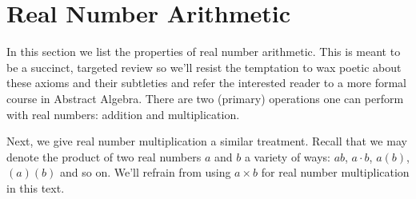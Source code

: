 \section{Real Number Arithmetic}
\label{RealNumberArithmetic}


In this section we list the properties of real number arithmetic.  This is meant to be a succinct, targeted review so we'll resist the temptation to wax poetic about these axioms and their subtleties and refer the interested reader to a more formal course in Abstract Algebra.  There are two (primary) operations one can perform with real numbers:  addition and multiplication.  

\medskip


\medskip

Next, we give real number multiplication a similar treatment.  Recall that we may denote the product of two real numbers $a$ and $b$ a variety of ways:  $ab$, $a \cdot b$, $a(b)$, $(a)(b)$ and so on.  We'll refrain from using $a \times b$ for real number multiplication in this text.

\medskip

